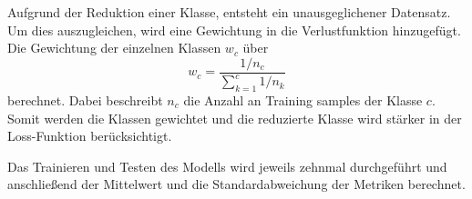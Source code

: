 Aufgrund der Reduktion einer Klasse, entsteht ein unausgeglichener Datensatz.
Um dies auszugleichen, wird eine Gewichtung in die Verlustfunktion hinzugefügt.
Die Gewichtung der einzelnen Klassen $w_c$ über 
\begin{equation}
  w_c = \frac{1/n_c}{\sum_{k=1}^{c} 1/n_k}
\end{equation}
berechnet. Dabei beschreibt $n_c$ die Anzahl an Training samples der Klasse $c$.
Somit werden die Klassen gewichtet und die reduzierte Klasse wird stärker in der Loss-Funktion berücksichtigt.~\cite{pytorchCrossEntropy}

Das Trainieren und Testen des Modells wird jeweils zehnmal durchgeführt und anschließend der Mittelwert und die Standardabweichung der
Metriken berechnet.


